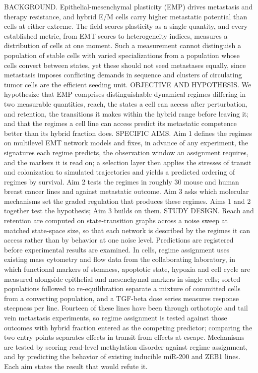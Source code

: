 BACKGROUND. Epithelial-mesenchymal plasticity (EMP) drives metastasis and therapy resistance, and hybrid E/M cells carry higher metastatic potential than cells at either extreme. The field scores plasticity as a single quantity, and every established metric, from EMT scores to heterogeneity indices, measures a distribution of cells at one moment. Such a measurement cannot distinguish a population of stable cells with varied specializations from a population whose cells convert between states, yet these should not seed metastases equally, since metastasis imposes conflicting demands in sequence and clusters of circulating tumor cells are the efficient seeding unit.
OBJECTIVE AND HYPOTHESIS. We hypothesize that EMP comprises distinguishable dynamical regimes differing in two measurable quantities, reach, the states a cell can access after perturbation, and retention, the transitions it makes within the hybrid range before leaving it; and that the regimes a cell line can access predict its metastatic competence better than its hybrid fraction does.
SPECIFIC AIMS. Aim 1 defines the regimes on multilevel EMT network models and fixes, in advance of any experiment, the signatures each regime predicts, the observation window an assignment requires, and the markers it is read on; a selection layer then applies the stresses of transit and colonization to simulated trajectories and yields a predicted ordering of regimes by survival. Aim 2 tests the regimes in roughly 30 mouse and human breast cancer lines and against metastatic outcome. Aim 3 asks which molecular mechanisms set the graded regulation that produces these regimes. Aims 1 and 2 together test the hypothesis; Aim 3 builds on them.
STUDY DESIGN. Reach and retention are computed on state-transition graphs across a noise sweep at matched state-space size, so that each network is described by the regimes it can access rather than by behavior at one noise level. Predictions are registered before experimental results are examined. In cells, regime assignment uses existing mass cytometry and flow data from the collaborating laboratory, in which functional markers of stemness, apoptotic state, hypoxia and cell cycle are measured alongside epithelial and mesenchymal markers in single cells; sorted populations followed to re-equilibration separate a mixture of committed cells from a converting population, and a TGF-beta dose series measures response steepness per line. Fourteen of these lines have been through orthotopic and tail vein metastasis experiments, so regime assignment is tested against those outcomes with hybrid fraction entered as the competing predictor; comparing the two entry points separates effects in transit from effects at escape. Mechanisms are tested by scoring read-level methylation disorder against regime assignment, and by predicting the behavior of existing inducible miR-200 and ZEB1 lines. Each aim states the result that would refute it.